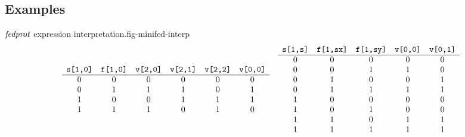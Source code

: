 \subsection{Examples}

\begin{fpfig}[t]{$\mathit{fedprot}$ expression interpretation.}{fig-minifed-interp}
{\footnotesize
  $$
  \begin{array}{cc}
    \begin{array}{cccccc}
      \verb+s[1,0]+ & \verb+f[1,0]+ & \verb+v[2,0]+  & \verb+v[2,1]+ & \verb+v[2,2]+ & \verb+v[0,0]+\\
      \hline
      0 & 0 & 0 & 0 & 0 & 0 \\ 
      0 & 1 & 1 & 1 & 0 & 1 \\ 
      1 & 0 & 0 & 1 & 1 & 1 \\ 
      1 & 1 & 1 & 0 & 1 & 0
    \end{array}
    & 
    \begin{array}{ccccc}
      \verb+s[1,s]+ & \verb+f[1,sx]+ & \verb+f[1,sy]+ & \verb+v[0,0]+ & \verb+v[0,1]+ \\
      \hline
      0 & 0 & 0 & 0 & 0 \\ 
      0 & 0 & 1 & 1 & 0 \\ 
      0 & 1 & 0 & 0 & 1 \\ 
      0 & 1 & 1 & 1 & 1 \\
      1 & 0 & 0 & 0 & 0 \\ 
      1 & 0 & 1 & 0 & 0 \\ 
      1 & 1 & 0 & 1 & 1 \\ 
      1 & 1 & 1 & 1 & 1  
    \end{array}
  \end{array}
  $$
}
\end{fpfig}

